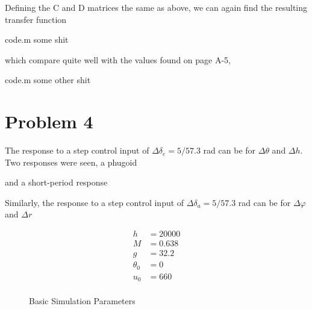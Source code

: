 \documentclass[12pt]{article}
\begin{document}
\noindent Defining the C and D matrices the same as above, we can again find the resulting transfer function

\begin{filecontents*}{code.m}
some shit
\end{filecontents*}


\noindent which compare quite well with the values found on page A-5,

\begin{filecontents*}{code.m}
some other shit
\end{filecontents*}


\newpage
\section{Problem 4}
The response to a step control input of $\Delta \delta_e = 5/57.3$ rad can be for $\Delta \theta$ and $\Delta h$. Two responses were seen, a phugoid

\noindent and a short-period response

\noindent Similarly, the response to a step control input of $\Delta \delta_a = 5/57.3$ rad can be for $\Delta \varphi$ and $\Delta r$

\newpage
\appendix

\begin{figure}
\begin{equation*}
  \begin{split}
  h &= 20000 \\
  M &= 0.638 \\
  g &= 32.2 \\
  \theta_0 &= 0 \\
  u_0 &= 660 \\
  \end{split}
\end{equation*}
  \caption{Basic Simulation Parameters}
\end{figure}
\end{document}
